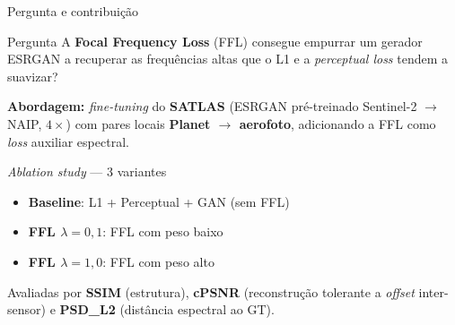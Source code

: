 \documentclass[aspectratio=169]{beamer}
\begin{document}
\begin{frame}{Pergunta e contribuição}

  \begin{block}{Pergunta}
    A \textbf{Focal Frequency Loss} (FFL) consegue empurrar um gerador ESRGAN
    a recuperar as frequências altas que o L1 e a \textit{perceptual loss}
    tendem a suavizar?
  \end{block}

  \vspace{0.4em}
  \textbf{Abordagem:} \textit{fine-tuning} do \textbf{SATLAS} (ESRGAN pré-treinado
  Sentinel-2 $\to$ NAIP, $4\times$) com pares locais \textbf{Planet $\to$ aerofoto},
  adicionando a FFL como \textit{loss} auxiliar espectral.

  \vspace{0.6em}
  \begin{block}{\textit{Ablation study} --- 3 variantes}
    \begin{itemize}
      \item \textbf{Baseline}: L1 + Perceptual + GAN (sem FFL)
      \item \textbf{FFL $\lambda=0{,}1$}: FFL com peso baixo
      \item \textbf{FFL $\lambda=1{,}0$}: FFL com peso alto
    \end{itemize}
  \end{block}

  Avaliadas por \textbf{SSIM} (estrutura), \textbf{cPSNR} (reconstrução tolerante a
  \textit{offset} inter-sensor) e \textbf{PSD\_L2} (distância espectral ao GT).

\end{frame}
\end{document}
